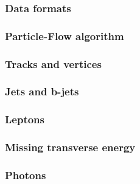 \subsubsection{Data formats}
\subsubsection{Particle-Flow algorithm}
\subsubsection{Tracks and vertices}
\subsubsection{Jets and b-jets}
\subsubsection{Leptons}
\subsubsection{Missing transverse energy}
\subsubsection{Photons}

